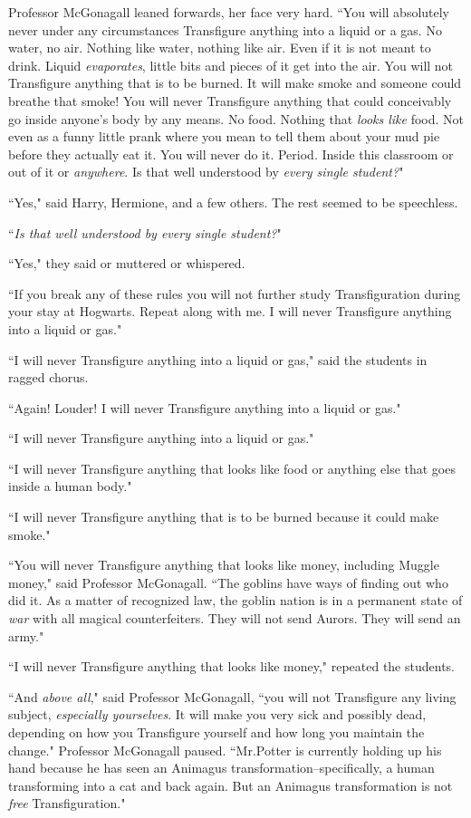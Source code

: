 Professor McGonagall leaned forwards, her face very hard. ``You will absolutely never under any circumstances Transfigure anything into a liquid or a gas. No water, no air. Nothing like water, nothing like air. Even if it is not meant to drink. Liquid \emph{evaporates}, little bits and pieces of it get into the air. You will not Transfigure anything that is to be burned. It will make smoke and someone could breathe that smoke! You will never Transfigure anything that could conceivably go inside anyone's body by any means. No food. Nothing that \emph{looks like} food. Not even as a funny little prank where you mean to tell them about your mud pie before they actually eat it. You will never do it. Period. Inside this classroom or out of it or \emph{anywhere}. Is that well understood by \emph{every single student?}"

``Yes," said Harry, Hermione, and a few others. The rest seemed to be speechless.

``\emph{Is that well understood by every single student?}"

``Yes," they said or muttered or whispered.

``If you break any of these rules you will not further study Transfiguration during your stay at Hogwarts. Repeat along with me. I will never Transfigure anything into a liquid or gas."

``I will never Transfigure anything into a liquid or gas," said the students in ragged chorus.

``Again! Louder! I will never Transfigure anything into a liquid or gas."

``I will never Transfigure anything into a liquid or gas."

``I will never Transfigure anything that looks like food or anything else that goes inside a human body."

``I will never Transfigure anything that is to be burned because it could make smoke."

``You will never Transfigure anything that looks like money, including Muggle money," said Professor McGonagall. ``The goblins have ways of finding out who did it. As a matter of recognized law, the goblin nation is in a permanent state of \emph{war} with all magical counterfeiters. They will not send Aurors. They will send an army."

``I will never Transfigure anything that looks like money," repeated the students.

``And \emph{above all}," said Professor McGonagall, ``you will not Transfigure any living subject, \emph{especially yourselves}. It will make you very sick and possibly dead, depending on how you Transfigure yourself and how long you maintain the change." Professor McGonagall paused. ``Mr.\?Potter is currently holding up his hand because he has seen an Animagus transformation\---specifically, a human transforming into a cat and back again. But an Animagus transformation is not \emph{free} Transfiguration."

